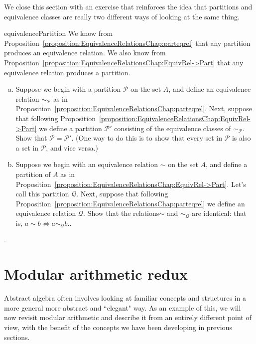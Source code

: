 We close this section with  an exercise that reinforces the idea that partitions and equivalence classes are really two different ways of looking at the same thing.

\begin{exercise}{equivalencePartition}
We know from Proposition~\ref{proposition:EquivalenceRelationsChap:parteqrel} that any partition  produces an equivalence relation.  
We also know from Proposition~\ref{proposition:EquivalenceRelationsChap:EquivRel->Part} that any equivalence relation produces a partition.
\begin{enumerate}[(a)]
\item
Suppose we begin with a partition $\mathcal{P}$ on the set $A$, and define an equivalence relation $\sim_{\mathcal{P}}$ as in Proposition~\ref{proposition:EquivalenceRelationsChap:parteqrel}. Next, suppose that following Proposition~\ref{proposition:EquivalenceRelationsChap:EquivRel->Part} we define a partition   $\mathcal{P}'$  consisting of the equivalence classes of $\sim_{\mathcal{P}}$. Show that $\mathcal{P}=\mathcal{P}'$. (One way to do this is to show that every set in $\mathcal{P}$ is also a set in $\mathcal{P}$, and vice versa.)
\item
Suppose we begin with an equivalence relation $\sim$ on the set $A$, and define a partition of $A$ as in Proposition~\ref{proposition:EquivalenceRelationsChap:EquivRel->Part}. Let's call this partition $\mathcal{Q}$.  Next, suppose that following Proposition~\ref{proposition:EquivalenceRelationsChap:parteqrel} we define an equivalence relation  $\mathcal{Q}$. Show that the relations$\sim$ and $\sim_{\mathcal{Q}}$ are identical:  that is, $a \sim b \iff a \sim_{\mathcal{Q}} b$..
\end{enumerate}
\end{exercise}. 


\section{Modular arithmetic redux\quad
{}} \label{EquivalenceRelationsModArithSect}

Abstract algebra often involves looking at familiar concepts and structures in a more general more abstract and ``elegant" way. As an example of this, we will now revisit modular arithmetic and describe it from an entirely different point of view, with the benefit of the concepts we have been developing in previous sections.

